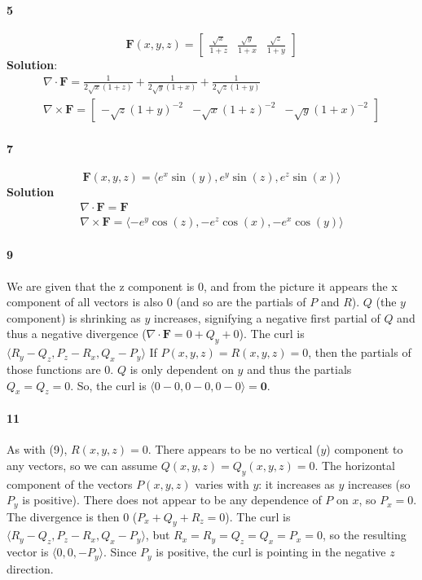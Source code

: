 \documentclass{article}
\begin{document}
    \paragraph{5}
    \[
        \mathbf{F}(x,y,z) =
        \begin{bmatrix}
            \frac{\sqrt{x}}{1+z} & \frac{\sqrt{y}}{1+x} & \frac{\sqrt{z}}{1+y}
        \end{bmatrix}
    \]
    \textbf{Solution}:
    \begin{gather*}
        \nabla \cdot \mathbf{F} = \frac{1}{2\sqrt{x}(1+z)} + \frac{1}{2\sqrt{y}(1+x)} + \frac{1}{2\sqrt{z}(1+y)}\\
        \nabla \times \mathbf{F} =
        \begin{bmatrix}
            -\sqrt{z}(1+y)^{-2} & -\sqrt{x}(1+z)^{-2} & -\sqrt{y}(1+x)^{-2}
        \end{bmatrix}
    \end{gather*}

    \paragraph{7}
    \[\mathbf{F}(x,y,z) = \langle e^{x}\sin(y), e^{y}\sin(z), e^{z}\sin(x) \rangle \]
    \textbf{Solution}
    \begin{gather*}
        \nabla \cdot \mathbf{F} = \mathbf{F}\\
        \nabla \times \mathbf{F} = \langle -e^{y}\cos(z), -e^{z}\cos(x), -e^{x}\cos(y) \rangle
    \end{gather*}

    \paragraph{9} We are given that the z component is 0, and from the picture it appears the x component of all vectors is also 0 (and so are the partials of $P$ and $R$).
    $Q$ (the $y$ component) is shrinking as $y$ increases, signifying a negative first partial of $Q$ and thus a negative divergence ($\nabla \cdot \mathbf{F} = 0 + Q_y + 0$).
    The curl is $\langle R_y - Q_z, P_z - R_x, Q_x - P_y \rangle$ If $P(x,y,z) = R(x,y,z) = 0$, then the partials of those functions are 0. $Q$ is only dependent on $y$ and thus
    the partials $Q_x=Q_z=0$. So, the curl is $\langle 0-0, 0-0, 0-0\rangle = \mathbf{0}$.

    \paragraph{11} As with (9), $R(x,y,z) = 0$. There appears to be no vertical ($y$) component to any vectors, so we can assume $Q(x,y,z)=Q_y(x,y,z)=0$. The horizontal
    component of the vectors $P(x,y,z)$ varies with $y$: it increases as $y$ increases (so $P_y$ is positive). There does not appear to be any dependence of $P$ on $x$,
    so $P_x = 0$. The divergence is then 0 ($P_x + Q_y + R_z = 0$). The curl is $\langle R_y - Q_z, P_z - R_x, Q_x - P_y \rangle$, but $R_x = R_y = Q_z = Q_x = P_x = 0$, so
    the resulting vector is $\langle0,0, - P_y\rangle$. Since $P_y$ is positive, the curl is pointing in the negative $z$ direction.
\end{document}
